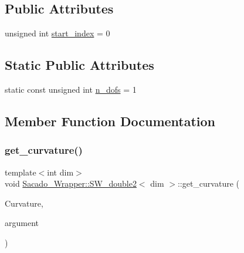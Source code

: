 \subsection*{Public Attributes}
\begin{DoxyCompactItemize}
\item 
unsigned int \hyperlink{classSacado__Wrapper_1_1SW__double2_ae7327540ad1fd725ea78ffc2268b423a}{start\+\_\+index} = 0
\end{DoxyCompactItemize}
\subsection*{Static Public Attributes}
\begin{DoxyCompactItemize}
\item 
static const unsigned int \hyperlink{classSacado__Wrapper_1_1SW__double2_a535aa77392e896e21151bfc63f92e020}{n\+\_\+dofs} = 1
\end{DoxyCompactItemize}


\subsection{Member Function Documentation}
\mbox{\label{classSacado__Wrapper_1_1SW__double2_a7d3f3a21cd842645af9861bf50308825}} 
\subsubsection{\texorpdfstring{get\+\_\+curvature()}{get\_curvature()}\hspace{0.1cm}{\footnotesize\ttfamily [1/3]}}
{\footnotesize\ttfamily template$<$int dim$>$ \\
void \hyperlink{classSacado__Wrapper_1_1SW__double2}{Sacado\+\_\+\+Wrapper\+::\+S\+W\+\_\+double2}$<$ dim $>$\+::get\+\_\+curvature (\begin{DoxyParamCaption}\item[{double \&}]{Curvature,  }\item[{Sacado\+::\+Fad\+::\+D\+Fad$<$ \hyperlink{Sacado__Wrapper_8h_a7e0893207b87dad05c66a34baac8ed2e}{D\+Fad\+Type} $>$ \&}]{argument }\end{DoxyParamCaption})}



